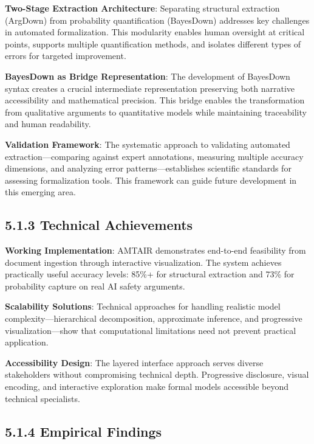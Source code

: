 \documentclass[
  11pt,
  letterpaper,
]{book}
\begin{document}
\textbf{Two-Stage Extraction Architecture}: Separating structural
extraction (ArgDown) from probability quantification (BayesDown)
addresses key challenges in automated formalization. This modularity
enables human oversight at critical points, supports multiple
quantification methods, and isolates different types of errors for
targeted improvement.

\textbf{BayesDown as Bridge Representation}: The development of
BayesDown syntax creates a crucial intermediate representation
preserving both narrative accessibility and mathematical precision. This
bridge enables the transformation from qualitative arguments to
quantitative models while maintaining traceability and human
readability.

\textbf{Validation Framework}: The systematic approach to validating
automated extraction---comparing against expert annotations, measuring
multiple accuracy dimensions, and analyzing error patterns---establishes
scientific standards for assessing formalization tools. This framework
can guide future development in this emerging area.

\subsection*{5.1.3 Technical
Achievements}\label{sec-technical-achievements}

\textbf{Working Implementation}: AMTAIR demonstrates end-to-end
feasibility from document ingestion through interactive visualization.
The system achieves practically useful accuracy levels: 85\%+ for
structural extraction and 73\% for probability capture on real AI safety
arguments.

\textbf{Scalability Solutions}: Technical approaches for handling
realistic model complexity---hierarchical decomposition, approximate
inference, and progressive visualization---show that computational
limitations need not prevent practical application.

\textbf{Accessibility Design}: The layered interface approach serves
diverse stakeholders without compromising technical depth. Progressive
disclosure, visual encoding, and interactive exploration make formal
models accessible beyond technical specialists.

\subsection*{5.1.4 Empirical Findings}\label{sec-empirical-findings}
\end{document}
